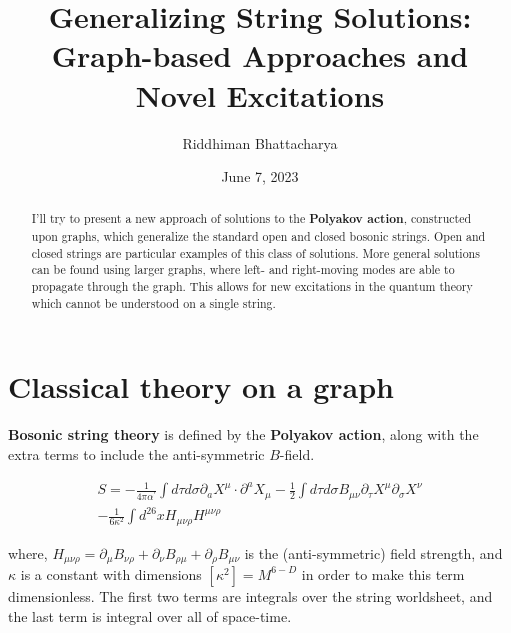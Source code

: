 \documentclass{article}
\begin{document}

\title{\Huge \textbf{Generalizing String Solutions: Graph-based Approaches and Novel Excitations}}
\author{ Riddhiman Bhattacharya}
\date{June 7, 2023}



\maketitle

\begin{abstract}
    I'll try to present a new approach of solutions to the \textbf{Polyakov action}, constructed upon graphs, which generalize the standard open and closed bosonic strings. Open and closed strings are particular examples of this class of solutions. More general solutions can be found using larger graphs, where left- and right-moving modes are able to propagate through the graph. This allows for new excitations in the quantum theory which cannot be understood on a single string.
\end{abstract}



\section{\large \textbf{Classical theory on a graph}}
\label{sec: classical}

\textbf{Bosonic string theory} is defined by the \textbf{Polyakov action}, along with the extra terms to include the anti-symmetric $B$-field.

\begin{equation}
\label{poly action}
\begin{aligned}
S = - \frac{1}{4 \pi \alpha^\prime} \int d\tau d\sigma \partial_a X^\mu \cdot \partial^a X_\mu 
- \frac{1}{2} \int d\tau d\sigma B_{\mu \nu} \partial_\tau X^\mu \partial_\sigma X^\nu \\
- \frac{1}{6 \kappa^2} \int d^{26} x H_{\mu \nu \rho} H^{\mu \nu \rho} 
\end{aligned}
\end{equation}

where, $H_{\mu \nu \rho} = \partial_\mu B_{\nu \rho} +  \partial_\nu B_{\rho \mu}+ \partial_\rho B_{\mu \nu}$ is the (anti-symmetric) field strength, and $\kappa$ is a constant with dimensions $[\kappa^2] = M^{6-D}$ in order to make this term dimensionless. The first two terms are integrals over the string worldsheet, and the last term is integral over all of space-time.
\end{document}
